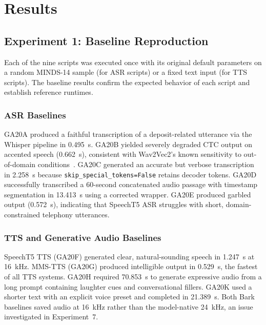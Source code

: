 \documentclass[conference]{IEEEtran}
\begin{document}
\section{Results}
\label{sec:results}

\subsection{Experiment 1: Baseline Reproduction}
\label{sec:exp1}

Each of the nine scripts was executed once with its original default parameters on a random MINDS-14 sample (for ASR scripts) or a fixed text input (for TTS scripts). The baseline results confirm the expected behavior of each script and establish reference runtimes.

\subsubsection{ASR Baselines}

GA20A produced a faithful transcription of a deposit-related utterance via the Whisper pipeline in 0.495~s. GA20B yielded severely degraded CTC output on accented speech (0.662~s), consistent with Wav2Vec2's known sensitivity to out-of-domain conditions~\cite{baevski2020}. GA20C generated an accurate but verbose transcription in 2.258~s because \texttt{skip\_special\_tokens=False} retains decoder tokens. GA20D successfully transcribed a 60-second concatenated audio passage with timestamp segmentation in 13.413~s using a corrected wrapper. GA20E produced garbled output (0.572~s), indicating that SpeechT5 ASR struggles with short, domain-constrained telephony utterances.

\subsubsection{TTS and Generative Audio Baselines}

SpeechT5 TTS (GA20F) generated clear, natural-sounding speech in 1.247~s at 16~kHz. MMS-TTS (GA20G) produced intelligible output in 0.529~s, the fastest of all TTS systems. GA20H required 70.853~s to generate expressive audio from a long prompt containing laughter cues and conversational fillers. GA20K used a shorter text with an explicit voice preset and completed in 21.389~s. Both Bark baselines saved audio at 16~kHz rather than the model-native 24~kHz, an issue investigated in Experiment~7.
\end{document}
